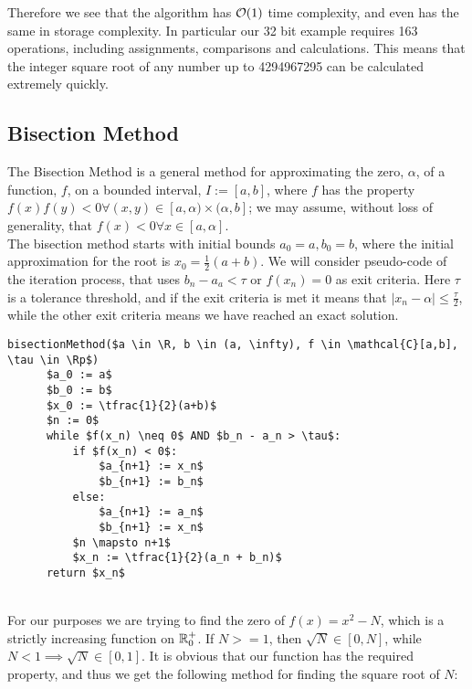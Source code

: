 Therefore we see that the algorithm has \(\mathcal{O}(1)\) time complexity, and even has the same in storage complexity. In particular our 32 bit example requires 163 operations, including assignments, comparisons and calculations. This means that the integer square root of any number up to 4294967295 can be calculated extremely quickly.

\subsection{Bisection Method}
\label{SUB_"Bisection Method for Roots"}
\theoremstyle{plain}
\newtheorem{Bisection Converges}{Proposition}[subsection]

The Bisection Method is a general method for approximating the zero, \(\alpha\), of a function, \(f\), on a bounded interval, \(I := [a,b]\), where \(f\) has the property \(f(x)f(y) < 0 \forall (x,y) \in [a,\alpha)\times(\alpha, b]\); we may assume, without loss of generality, that \(f(x) < 0 \forall x \in [a, \alpha]\).\\

The bisection method starts with initial bounds \(a_0 = a, b_0 = b\), where the initial approximation for the root is \(x_0 = \frac{1}{2}(a+b)\). We will consider pseudo-code of the iteration process, that uses \(b_n - a_a < \tau\) or \(f(x_n) = 0\) as exit criteria. Here \(\tau\) is a tolerance threshold, and if the exit criteria is met it means that \(|x_n - \alpha| \le \frac{\tau}{2}\), while the other exit criteria means we have reached an exact solution.\\

\label{PCD_"General Bisection Method"}
\begin{lstlisting}[frame=single,mathescape,caption={General Bisection Method}]
  bisectionMethod($a \in \R, b \in (a, \infty), f \in \mathcal{C}[a,b], \tau \in \Rp$)
      $a_0 := a$
      $b_0 := b$
      $x_0 := \tfrac{1}{2}(a+b)$
	  $n := 0$
	  while $f(x_n) \neq 0$ AND $b_n - a_n > \tau$:
          if $f(x_n) < 0$:
              $a_{n+1} := x_n$
              $b_{n+1} := b_n$
          else:
              $a_{n+1} := a_n$
              $b_{n+1} := x_n$
          $n \mapsto n+1$
          $x_n := \tfrac{1}{2}(a_n + b_n)$
      return $x_n$
\end{lstlisting}\\
		
For our purposes we are trying to find the zero of \(f(x) = x^2 - N\), which is a strictly increasing function on \(\mathbb{R}^+_0\). If \(N >= 1\), then \(\sqrt{N} \in [0, N]\), while \(N < 1 \implies \sqrt{N} \in [0, 1]\). It is obvious that our function has the required property, and thus we get the following method for finding the square root of \(N\):\\

